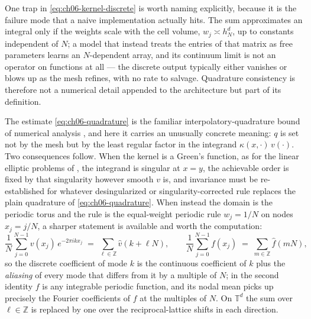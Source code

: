 One trap in \eqref{eq:ch06-kernel-discrete} is worth naming explicitly, because
it is the failure mode that a naive implementation actually hits. The sum
approximates an integral only if the weights scale with the cell volume,
$w_j \asymp h_N^d$, up to constants independent of $N$; a model that instead
treats the entries of that matrix as free parameters learns an $N$-dependent
array, and its continuum
limit is not an operator on functions at all --- the discrete output typically
either vanishes or blows up as the mesh refines, with no rate to salvage.
Quadrature consistency is therefore not a numerical detail appended to the
architecture but part of its definition.

The estimate \eqref{eq:ch06-quadrature} is the familiar interpolatory-quadrature
bound of numerical analysis \cite{quarteroni2008numerical},
and here it carries an unusually concrete meaning: $q$ is set not by the mesh but
by the least regular factor in the integrand $\kappa(x,\cdot)\,v(\cdot)$. Two
consequences follow. When the kernel is a Green's function, as for the linear
elliptic problems of
, the integrand is
singular at $x=y$, the achievable order is fixed by that singularity however
smooth $v$ is, and invariance must be re-established for whatever
desingularized or singularity-corrected rule replaces the plain quadrature
of \eqref{eq:ch06-quadrature}.
When instead the domain is the periodic torus and the rule is the equal-weight
periodic rule $w_j = 1/N$ on nodes $x_j = j/N$, a sharper statement is available
and worth the computation:
\begin{equation}
  \label{eq:ch06-alias}
  \frac{1}{N}\sum_{j=0}^{N-1} v(x_j)\, e^{-2\pi i k x_j} \;=\; \sum_{\ell \in \mathbb{Z}} \hat{v}(k+\ell N),
  \qquad
  \frac{1}{N}\sum_{j=0}^{N-1} f(x_j) \;=\; \sum_{m \in \mathbb{Z}} \hat{f}(mN),
\end{equation}
so the discrete coefficient of mode $k$ is the continuous coefficient of $k$
plus the \emph{aliasing}
of every mode that differs from it by a multiple of $N$; in the second identity
$f$ is any integrable periodic function, and its nodal mean picks up precisely
the Fourier coefficients of $f$ at the multiples of $N$. On $\mathbb{T}^d$ the
sum over $\ell\in\mathbb{Z}$ is replaced by one over the reciprocal-lattice
shifts in each direction.

